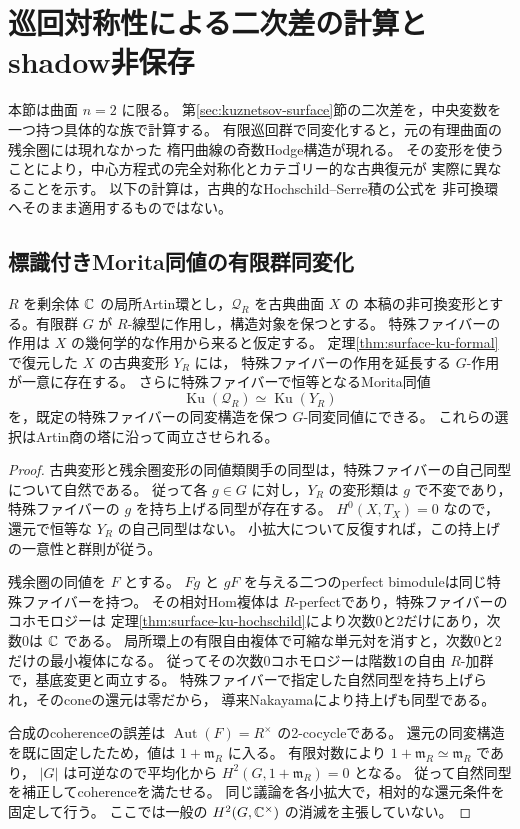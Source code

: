 \section{巡回対称性による二次差の計算とshadow非保存}
\label{sec:kuznetsov-shadow-obstruction}

本節は曲面 $n=2$ に限る。
第\ref{sec:kuznetsov-surface}節の二次差を，中央変数を一つ持つ具体的な族で計算する。
有限巡回群で同変化すると，元の有理曲面の残余圏には現れなかった
楕円曲線の奇数Hodge構造が現れる。
その変形を使うことにより，中心方程式の完全対称化とカテゴリー的な古典復元が
実際に異なることを示す。
以下の計算は，古典的なHochschild--Serre積の公式を
非可換環へそのまま適用するものではない。

\subsection{標識付きMorita同値の有限群同変化}

\begin{lemma}[古典復元と有限群作用]
\label{lem:ku-finite-equivariant-companion}
$R$ を剰余体 $\mathbb C$ の局所Artin環とし，$\mathcal Q_R$ を古典曲面 $X$ の
本稿の非可換変形とする。有限群 $G$ が $R$-線型に作用し，構造対象を保つとする。
特殊ファイバーの作用は $X$ の幾何学的な作用から来ると仮定する。
定理\ref{thm:surface-ku-formal}で復元した $X$ の古典変形 $Y_R$ には，
特殊ファイバーの作用を延長する $G$-作用が一意に存在する。
さらに特殊ファイバーで恒等となるMorita同値
\[
 \operatorname{Ku}(\mathcal Q_R)\simeq\operatorname{Ku}(Y_R)
\]
を，既定の特殊ファイバーの同変構造を保つ $G$-同変同値にできる。
これらの選択はArtin商の塔に沿って両立させられる。
\end{lemma}
\begin{proof}
古典変形と残余圏変形の同値類関手の同型は，特殊ファイバーの自己同型について自然である。
従って各 $g\in G$ に対し，$Y_R$ の変形類は $g$ で不変であり，
特殊ファイバーの $g$ を持ち上げる同型が存在する。
$H^0(X,T_X)=0$ なので，還元で恒等な $Y_R$ の自己同型はない。
小拡大について反復すれば，この持上げの一意性と群則が従う。

残余圏の同値を $F$ とする。
$Fg$ と $gF$ を与える二つのperfect bimoduleは同じ特殊ファイバーを持つ。
その相対Hom複体は $R$-perfectであり，特殊ファイバーのコホモロジーは
定理\ref{thm:surface-ku-hochschild}により次数0と2だけにあり，次数0は $\mathbb C$ である。
局所環上の有限自由複体で可縮な単元対を消すと，次数0と2だけの最小複体になる。
従ってその次数0コホモロジーは階数1の自由 $R$-加群で，基底変更と両立する。
特殊ファイバーで指定した自然同型を持ち上げられ，そのconeの還元は零だから，
導来Nakayamaにより持上げも同型である。

合成のcoherenceの誤差は $\operatorname{Aut}(F)=R^\times$ の2-cocycleである。
還元の同変構造を既に固定したため，値は $1+\mathfrak m_R$ に入る。
有限対数により $1+\mathfrak m_R\simeq\mathfrak m_R$ であり，
$|G|$ は可逆なので平均化から $H^2(G,1+\mathfrak m_R)=0$ となる。
従って自然同型を補正してcoherenceを満たせる。
同じ議論を各小拡大で，相対的な還元条件を固定して行う。
ここでは一般の $H^2(G,\mathbb C^\times)$ の消滅を主張していない。
\end{proof}

